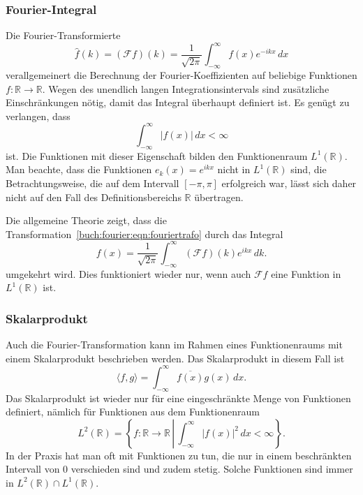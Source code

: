 \subsubsection{Fourier-Integral}
Die Fourier-Transformierte
\begin{equation}
\hat{f}(k)
=
(\mathscr{F}f)(k)
=
\frac{1}{\sqrt{2\pi}}
\int_{-\infty}^\infty f(x)e^{-ikx}\,dx
\label{buch:fourier:eqn:fouriertrafo}
\end{equation}
verallgemeinert die Berechnung der Fourier-Koeffizienten
auf beliebige Funktionen $f\colon\mathbb{R}\to\mathbb{R}$.
Wegen des unendlich langen Integrationsintervals sind zusätzliche
Einschränkungen nötig, damit das Integral überhaupt definiert ist.
Es genügt zu verlangen, dass
\[
\int_{-\infty}^\infty |f(x)|\,dx < \infty
\]
ist.
Die Funktionen mit dieser Eigenschaft bilden den Funktionenraum
$L^1(\mathbb{R})$.
Man beachte, dass die Funktionen
\(
e_k(x) = e^{ikx}
\)
nicht in $L^1(\mathbb{R})$ sind, die Betrachtungsweise, die auf dem
%
Intervall $[-\pi,\pi]$ erfolgreich war,
lässt sich daher nicht auf den Fall des
Definitionsbereichs $\mathbb{R}$ übertragen.

Die allgemeine Theorie zeigt, dass die
Transformation~\eqref{buch:fourier:eqn:fouriertrafo}
durch das Integral
\[
f(x)
=
\frac{1}{\sqrt{2\pi}}
\int_{-\infty}^\infty (\mathscr{F}f)(k)e^{ikx}\,dk.
\]
umgekehrt wird.
Dies funktioniert wieder nur, wenn auch $\mathscr{F}f$ eine Funktion
in $L^1(\mathbb{R})$ ist.

%
%
\subsubsection{Skalarprodukt}
Auch die Fourier-Transformation kann im Rahmen eines Funktionenraums
mit einem Skalarprodukt beschrieben werden.
Das Skalarprodukt in diesem Fall ist
%
\[
\langle f,g\rangle
=
\int_{-\infty}^\infty \overline{f(x)} g(x)\,dx.
\]
Das Skalarprodukt ist wieder nur für eine eingeschränkte Menge von
Funktionen definiert, nämlich für Funktionen aus dem Funktionenraum
\[
L^2(\mathbb{R})
=
\left\{
f\colon\mathbb{R}\to\mathbb{R}
\,\left|\,
\int_{-\infty}^\infty |f(x)|^2\,dx < \infty
\right.
\right\}.
\]
%
In der Praxis hat man oft mit Funktionen zu tun, die nur in einem
beschränkten Intervall von $0$ verschieden sind und zudem stetig.
Solche Funktionen sind immer in $L^2(\mathbb{R})\cap L^1(\mathbb{R})$.

%
%
